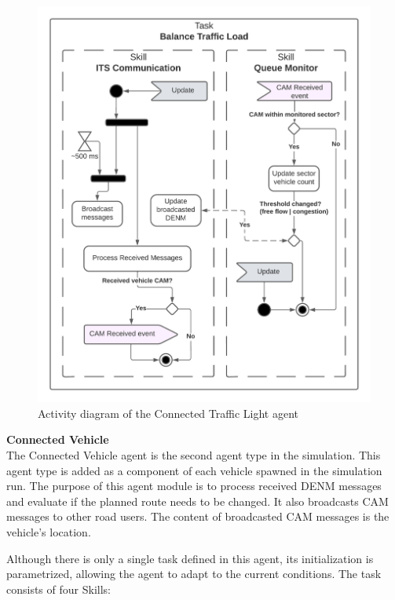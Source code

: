 \documentclass[main.tex]{subfiles}
\begin{document}
\begin{figure}[htbp]
    \centering
    \includegraphics[width=.8\textwidth]{SmartTrafficLight.png}
    \caption{Activity diagram of the Connected Traffic Light agent}
    \label{ad-trafficLight}
\end{figure}

\textbf{Connected Vehicle} \smallskip \\
The Connected Vehicle agent is the second agent type in the simulation. This agent type is 
added as a component of each vehicle spawned in the simulation run. The purpose of this 
agent module is to process received DENM messages and evaluate if the planned route needs 
to be changed. It also broadcasts CAM messages to other road users. The content of 
broadcasted CAM messages is the vehicle's location.

Although there is only a single task defined in this agent, its initialization is 
parametrized, allowing the agent to adapt to the current conditions. The task consists of 
four Skills:
\end{document}
